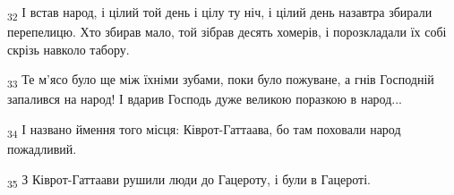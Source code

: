 \begin{tcolorbox}
\textsubscript{32} І встав народ, і цілий той день і цілу ту ніч, і цілий день назавтра збирали перепелицю. Хто збирав мало, той зібрав десять хомерів, і порозкладали їх собі скрізь навколо табору.
\end{tcolorbox}
\begin{tcolorbox}
\textsubscript{33} Те м'ясо було ще між їхніми зубами, поки було пожуване, а гнів Господній запалився на народ! І вдарив Господь дуже великою поразкою в народ...
\end{tcolorbox}
\begin{tcolorbox}
\textsubscript{34} І названо ймення того місця: Ківрот-Гаттаава, бо там поховали народ пожадливий.
\end{tcolorbox}
\begin{tcolorbox}
\textsubscript{35} З Ківрот-Гаттаави рушили люди до Гацероту, і були в Гацероті.
\end{tcolorbox}
